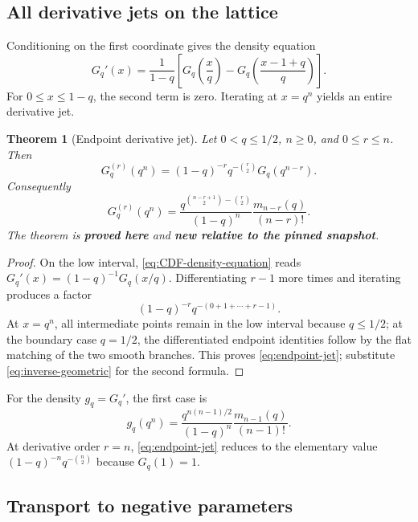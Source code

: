 \documentclass[11pt,oneside]{article}
\numberwithin{equation}{section}
\newtheorem{theorem}{Theorem}[section]
\theoremstyle{definition}
\theoremstyle{remark}
\newcommand{\proved}{\textcolor{deepgreen}{\textbf{proved here}}}
\newcommand{\auditnew}{\textcolor{deepviolet}{\textbf{new relative to the pinned snapshot}}}
\begin{document}
\subsection{All derivative jets on the lattice}

Conditioning on the first coordinate gives the density equation
\begin{equation}
 G_q'(x)=\frac1{1-q}
 \left[
 G_q\!\left(\frac{x}{q}\right)
 -G_q\!\left(\frac{x-1+q}{q}\right)
 \right].
 \label{eq:CDF-density-equation}
\end{equation}
For $0\le x\le1-q$, the second term is zero.  Iterating at $x=q^n$ yields an
entire derivative jet.

\begin{theorem}[Endpoint derivative jet]
\label{thm:endpoint-jet}
Let $0<q\le1/2$, $n\ge0$, and $0\le r\le n$.  Then
\begin{equation}
 \boxed{
 G_q^{(r)}(q^n)=
 (1-q)^{-r}q^{-\binom r2}G_q(q^{n-r}).}
 \label{eq:endpoint-jet}
\end{equation}
Consequently
\begin{equation}
 G_q^{(r)}(q^n)=
 \frac{q^{\binom{n-r+1}{2}-\binom r2}}
 {(1-q)^n}
 \frac{m_{n-r}(q)}{(n-r)!}.
 \label{eq:endpoint-jet-moment}
\end{equation}
The theorem is \proved{} and \auditnew.
\end{theorem}

\begin{proof}
On the low interval, \eqref{eq:CDF-density-equation} reads
$G_q'(x)=(1-q)^{-1}G_q(x/q)$.  Differentiating $r-1$ more times and iterating
produces a factor
\[
 (1-q)^{-r}q^{-(0+1+\cdots+r-1)}.
\]
At $x=q^n$, all intermediate points remain in the low interval because
$q\le1/2$; at the boundary case $q=1/2$, the differentiated endpoint identities
follow by the flat matching of the two smooth branches.  This proves \eqref{eq:endpoint-jet}; substitute
\eqref{eq:inverse-geometric} for the second formula.
\end{proof}

For the density $g_q=G_q'$, the first case is
\begin{equation}
 g_q(q^n)=
 \frac{q^{n(n-1)/2}}{(1-q)^n}
 \frac{m_{n-1}(q)}{(n-1)!}.
 \label{eq:density-endpoint}
\end{equation}
At derivative order $r=n$, \eqref{eq:endpoint-jet} reduces to the elementary
value $(1-q)^{-n}q^{-\binom n2}$ because $G_q(1)=1$.

\subsection{Transport to negative parameters}
\end{document}
